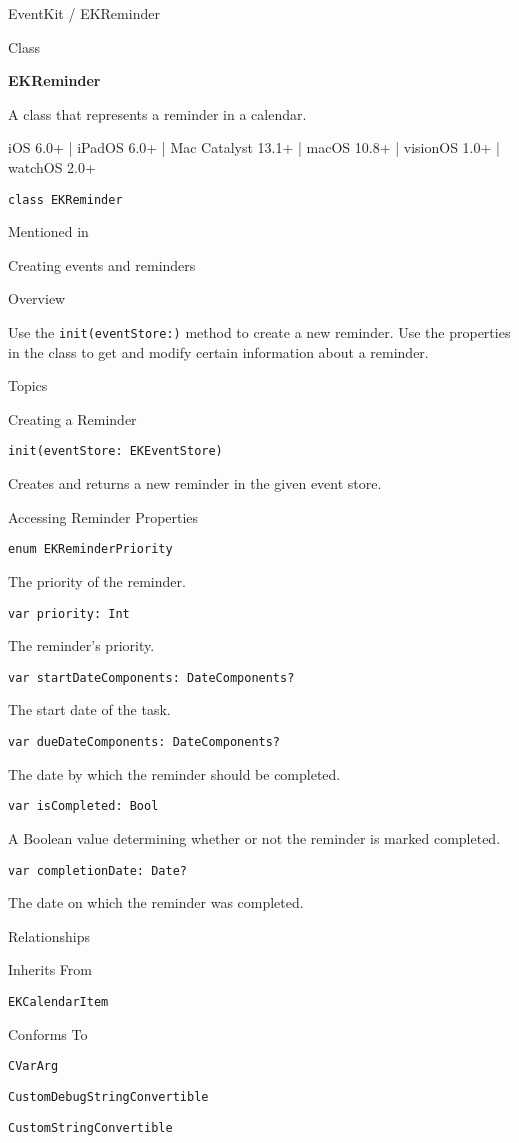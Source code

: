 \documentclass{article}
\title{}
\author{}
\date{}
\begin{document}
EventKit / EKReminder

Class

\textbf{EKReminder}

A class that represents a reminder in a calendar.

iOS 6.0+ | iPadOS 6.0+ | Mac Catalyst 13.1+ | macOS 10.8+ | visionOS 1.0+ | watchOS 2.0+

\texttt{class EKReminder}

Mentioned in

Creating events and reminders

Overview

Use the \texttt{init(eventStore:)} method to create a new reminder. Use the properties in the class to get and modify certain information about a reminder.

Topics

Creating a Reminder

\texttt{init(eventStore: EKEventStore)}

Creates and returns a new reminder in the given event store.

Accessing Reminder Properties

\texttt{enum EKReminderPriority}

The priority of the reminder.

\texttt{var priority: Int}

The reminder's priority.

\texttt{var startDateComponents: DateComponents?}

The start date of the task.

\texttt{var dueDateComponents: DateComponents?}

The date by which the reminder should be completed.

\texttt{var isCompleted: Bool}

A Boolean value determining whether or not the reminder is marked completed.

\texttt{var completionDate: Date?}

The date on which the reminder was completed.

Relationships

Inherits From

\texttt{EKCalendarItem}

Conforms To

\texttt{CVarArg}

\texttt{CustomDebugStringConvertible}

\texttt{CustomStringConvertible}
\end{document}
